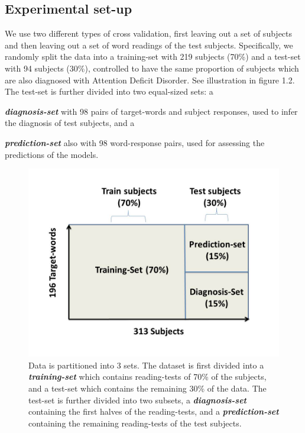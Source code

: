 \subsection{Experimental set-up}
We use two different types of cross validation, first leaving out a set of subjects and then leaving out a set of word readings of the test subjects. Specifically, we randomly split the data into a training-set with 219 subjects (70\%) and a test-set with 94 subjects (30\%), controlled to have the same proportion of subjects which are also diagnosed with Attention Deficit Disorder. See illustration in figure 1.2. The test-set is further divided into two equal-sized sets: a {\textit {\textbf {diagnosis-set}} with 98 pairs of target-words and subject responses, used to infer the diagnosis of test subjects, and a {\textit {\textbf {prediction-set}} also with 98 word-response pairs, used for assessing the predictions of the models. 

\begin{figure}[h]
\vspace{.3in}
\includegraphics[width=\linewidth]{Figures/Ch1/trainTest2}
\caption{Data is partitioned into 3 sets. The dataset is first divided into a \textit {\textbf {training-set}} which contains reading-tests of 70\% of the subjects, and a test-set which contains the remaining 30\% of the data. The test-set is further divided into two subsets, a \textit {\textbf {diagnosis-set}} containing the first halves of the reading-tests, and a \textit {\textbf {prediction-set}} containing the remaining reading-tests of the test subjects.}
\end{figure}

}}
